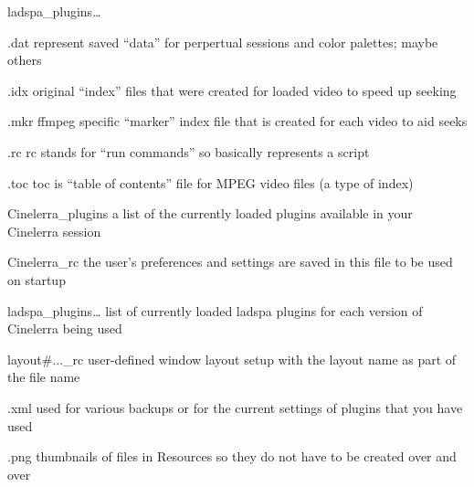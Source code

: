 \begin{labeling}{ladspa\_plugins{\dots}}
	\item [.dat] represent saved ``data'' for perpertual sessions and color palettes; maybe others
	\item [.idx] original ``index'' files that were created for loaded video to speed up seeking
	\item [.mkr] ffmpeg specific ``marker'' index file that is created for each video to aid seeks
	\item [.rc] rc stands for ``run commands'' so basically represents a script
	\item [.toc] toc is ``table of contents'' file for MPEG video files (a type of index)
	\item [Cinelerra\_plugins] a list of the currently loaded plugins available in your Cinelerra session
	\item [Cinelerra\_rc] the user's preferences and settings are saved in this file to be used on startup
	\item [ladspa\_plugins{\dots}] list of currently loaded ladspa plugins for each version of Cinelerra being used
	\item [layout\#...\_rc] user-defined window layout setup with the layout name as part of the file name
	\item [.xml] used for various backups or for the current settings of plugins that you have used
	\item [.png] thumbnails of files in Resources so they do not have to be created over and over
\end{labeling}

